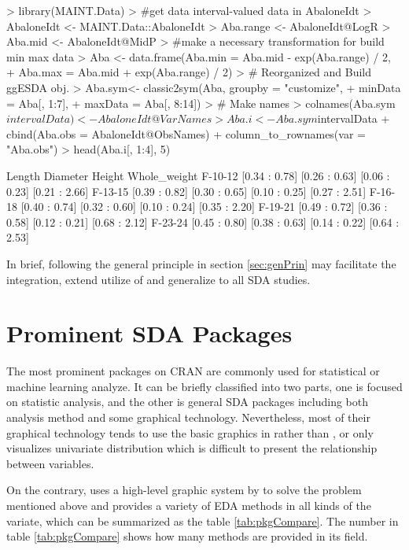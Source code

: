 \documentclass[article]{jss}
\begin{document}
\begin{Schunk}
\begin{Sinput}
> library(MAINT.Data)
> #get data interval-valued data in AbaloneIdt
> AbaloneIdt <- MAINT.Data::AbaloneIdt
> Aba.range <- AbaloneIdt@LogR
> Aba.mid <- AbaloneIdt@MidP
> #make a necessary transformation for build min max data
> Aba <- data.frame(Aba.min = Aba.mid - exp(Aba.range) / 2,
+                   Aba.max = Aba.mid + exp(Aba.range) / 2)
> # Reorganized and Build ggESDA obj.
> Aba.sym<- classic2sym(Aba, groupby = "customize",
+                       minData = Aba[, 1:7],
+                       maxData = Aba[, 8:14])
> # Make names
> colnames(Aba.sym$intervalData) <- AbaloneIdt@VarNames
> Aba.i <- Aba.sym$intervalData %
+   cbind(Aba.obs = AbaloneIdt@ObsNames) %
+   column_to_rownames(var = "Aba.obs")
> head(Aba.i[, 1:4], 5)
\end{Sinput}
\begin{Soutput}
               Length      Diameter        Height  Whole_weight
F-10-12 [0.34 : 0.78] [0.26 : 0.63] [0.06 : 0.23] [0.21 : 2.66]
F-13-15 [0.39 : 0.82] [0.30 : 0.65] [0.10 : 0.25] [0.27 : 2.51]
F-16-18 [0.40 : 0.74] [0.32 : 0.60] [0.10 : 0.24] [0.35 : 2.20]
F-19-21 [0.49 : 0.72] [0.36 : 0.58] [0.12 : 0.21] [0.68 : 2.12]
F-23-24 [0.45 : 0.80] [0.38 : 0.63] [0.14 : 0.22] [0.64 : 2.53]
\end{Soutput}
\end{Schunk}

In brief, following the general principle in section \ref{sec:genPrin} may facilitate the integration, extend utilize of  and generalize to all SDA studies.

\section{Prominent SDA Packages}

The most prominent packages on CRAN are commonly used for statistical or machine learning analyze. It can be briefly classified into two parts, one is focused on statistic analysis, and the other is general SDA packages including both analysis method and some graphical technology. Nevertheless, most of their graphical technology tends to use the basic graphics in  rather than , or only visualizes univariate distribution which is difficult to present the relationship between variables. 

On the contrary,  uses a high-level graphic system by  to solve the problem mentioned above and provides a variety of EDA methods in all kinds of the variate, which can be summarized as the table \ref{tab:pkgCompare}. The number in table \ref{tab:pkgCompare} shows how many methods are provided in its field.
\end{document}
